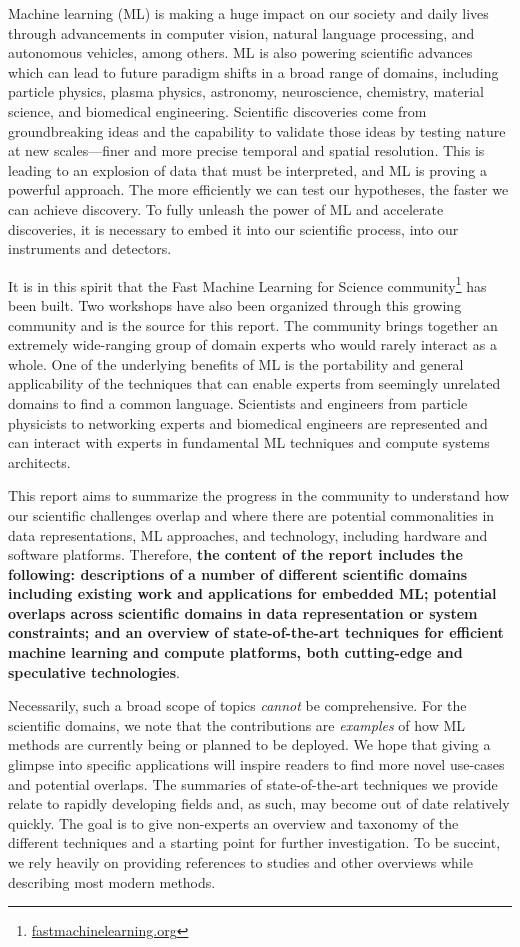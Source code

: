 Machine learning (ML) is making a huge impact on our society and daily lives through advancements in computer vision, natural language processing, and autonomous vehicles, among others.  
ML is also powering scientific advances which can lead to future paradigm shifts in a broad range of domains, including particle physics, plasma physics, astronomy, neuroscience, chemistry, material science, and biomedical engineering.  
Scientific discoveries come from groundbreaking ideas and the capability to validate those ideas by testing nature at new scales---finer and more precise temporal and spatial resolution.  
This is leading to an explosion of data that must be interpreted, and ML is proving a powerful approach. 
The more efficiently we can test our hypotheses, the faster we can achieve discovery.  
To fully unleash the power of ML and accelerate discoveries, it is necessary to embed it into our scientific process, into our instruments and detectors.

It is in this spirit that the Fast Machine Learning for Science community\footnote{\url{fastmachinelearning.org}} has been built.  
Two workshops have also been organized through this growing community and is the source for this report.  
The community brings together an extremely wide-ranging group of domain experts who would rarely interact as a whole. 
One of the underlying benefits of ML is the portability and general applicability of the techniques that can enable experts from seemingly unrelated domains to find a common language. 
Scientists and engineers from particle physicists to networking experts and biomedical engineers are represented and can interact with experts in fundamental ML techniques and compute systems architects.  

This report aims to summarize the progress in the community to understand how our scientific challenges overlap and where there are potential commonalities in data representations, ML approaches, and technology, including hardware and software platforms. 
Therefore, \textbf{the content of the report includes the following: descriptions of a number of different scientific domains including existing work and applications for embedded ML; potential overlaps across scientific domains in data representation or system constraints; and an overview of state-of-the-art techniques for efficient machine learning and compute platforms, both cutting-edge and speculative technologies}.  

Necessarily, such a broad scope of topics \textit{cannot} be comprehensive. 
For the scientific domains, we note that the contributions are \textit{examples} of how ML methods are currently being or planned to be deployed.  
We hope that giving a glimpse into specific applications will inspire readers to find more novel use-cases and potential overlaps. 
The summaries of state-of-the-art techniques we provide relate to rapidly developing fields and, as such, may become out of date relatively quickly.  
The goal is to give non-experts an overview and taxonomy of the different techniques and a starting point for further investigation.
To be succint, we rely heavily on providing references to studies and other overviews while describing most modern methods.

